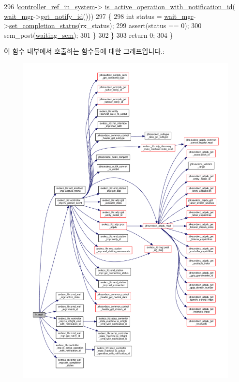 \begin{DoxyCode}
296             !\hyperlink{namespaceavdecc__lib_a8f621b84ee2ae87ab9a54ca441e21f9b}{controller\_ref\_in\_system}->
      \hyperlink{classavdecc__lib_1_1controller__imp_a478e43b65aafe1a0e927e84304047003}{is\_active\_operation\_with\_notification\_id}(
      \hyperlink{classavdecc__lib_1_1system__layer2__multithreaded__callback_af8628baeb5f5db798721c4af01e8b253}{wait\_mgr}->\hyperlink{classavdecc__lib_1_1cmd__wait__mgr_acae98c938b8473f03ddd1a430e30be1d}{get\_notify\_id}()))
297         \{
298             \textcolor{keywordtype}{int} status = \hyperlink{classavdecc__lib_1_1system__layer2__multithreaded__callback_af8628baeb5f5db798721c4af01e8b253}{wait\_mgr}->\hyperlink{classavdecc__lib_1_1cmd__wait__mgr_a979ab3347d7c228509b928383b7861ca}{set\_completion\_status}(rx\_status);
299             assert(status == 0);
300             sem\_post(\hyperlink{classavdecc__lib_1_1system__layer2__multithreaded__callback_a48196bb38ecccc4d99ae5c5d65e8b430}{waiting\_sem});
301         \}
302     \}
303     \textcolor{keywordflow}{return} 0;
304 \}
\end{DoxyCode}


이 함수 내부에서 호출하는 함수들에 대한 그래프입니다.\+:
\nopagebreak
\begin{figure}[H]
\begin{center}
\leavevmode
\includegraphics[width=350pt]{classavdecc__lib_1_1system__layer2__multithreaded__callback_a5f2abae24cc383c43a31ca88ffcebab1_cgraph}
\end{center}
\end{figure}




